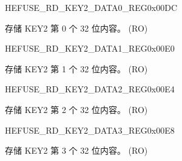 \begin{register}{H}{EFUSE\_RD\_KEY2\_DATA0\_REG}{0x00DC}\label{regdesc:EFUSERDKEY2DATA0REG}
%
\regnewline%
\begin{regdesc}\begin{reglist}
\label{fielddesc:EFUSEKEY2DATA0}\item [EFUSE\_KEY2\_DATA0] 存储 KEY2 第 0 个 32 位内容。 (RO)
\end{reglist}\end{regdesc}
\end{register}


\begin{register}{H}{EFUSE\_RD\_KEY2\_DATA1\_REG}{0x00E0}\label{regdesc:EFUSERDKEY2DATA1REG}
%
\regnewline%
\begin{regdesc}\begin{reglist}
\label{fielddesc:EFUSEKEY2DATA1}\item [EFUSE\_KEY2\_DATA1] 存储 KEY2 第 1 个 32 位内容。 (RO)
\end{reglist}\end{regdesc}
\end{register}


\begin{register}{H}{EFUSE\_RD\_KEY2\_DATA2\_REG}{0x00E4}\label{regdesc:EFUSERDKEY2DATA2REG}
%
\regnewline%
\begin{regdesc}\begin{reglist}
\label{fielddesc:EFUSEKEY2DATA2}\item [EFUSE\_KEY2\_DATA2] 存储 KEY2 第 2 个 32 位内容。 (RO)
\end{reglist}\end{regdesc}
\end{register}


\begin{register}{H}{EFUSE\_RD\_KEY2\_DATA3\_REG}{0x00E8}\label{regdesc:EFUSERDKEY2DATA3REG}
%
\regnewline%
\begin{regdesc}\begin{reglist}
\label{fielddesc:EFUSEKEY2DATA3}\item [EFUSE\_KEY2\_DATA3] 存储 KEY2 第 3 个 32 位内容。 (RO)
\end{reglist}\end{regdesc}
\end{register}


